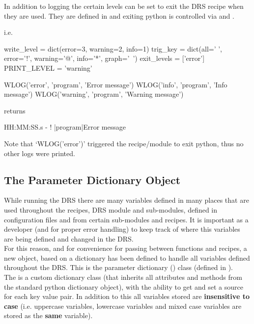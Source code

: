 \newpage 

\noindent In addition to logging the certain levels can be set to exit the DRS recipe when they are used. They are defined in  and exiting python is controlled via  and .

i.e. 
\begin{pythonbox}
write_level = dict(error=3, warning=2, info=1)
trig_key = dict(all=' ', error='!', warning='@', info='*', graph='~')
exit_levels = ['error']
PRINT_LEVEL = 'warning'

WLOG('error', 'program', 'Error message')
WLOG('info', 'program', 'Info message')
WLOG('warning', 'program', 'Warning message')

\end{pythonbox}
returns
\begin{cmdboxprint}
HH:MM:SS.s - ! |program|Error message
\end{cmdboxprint}
\begin{note}
Note that `WLOG('error')' triggered the recipe/module to exit python, thus no other logs were printed.
\end{note}

\subsection{The Parameter Dictionary Object}
\label{ch:rules:drs_specific:param_dict}

While running the DRS there are many variables defined in many places that are used throughout the recipes, DRS module and sub-modules, defined in configuration files and from certain sub-modules and recipes. It is important as a developer (and for proper error handling) to keep track of where this variables are being defined and changed in the DRS. \\

\noindent For this reason, and for convenience for passing between functions and recipes, a new object, based on a dictionary has been defined to handle all variables defined throughout the DRS. This is the parameter dictionary (\ParamDict) class (defined in ). \\

\noindent The \ParamDict is a custom dictionary class (that inherits all attributes and methods from the standard python dictionary object), with the ability to get and set a source for each key value pair. In addition to this all variables stored are \textbf{insensitive to case} (i.e. uppercase variables, lowercase variables and mixed case variables are stored as the \textbf{same} variable). \\

